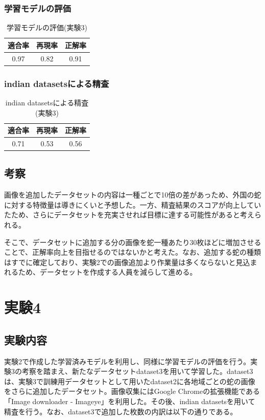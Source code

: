 \documentclass[a4paper, 11pt, titlepage]{jsarticle}
\begin{document}
\subsubsection{学習モデルの評価}
\begin{table}[htb]
\centering
  \caption{学習モデルの評価(実験3)}
  \begin{tabular}{|c|c|c|}  \hline
    適合率 & 再現率 & 正解率 \\ \hline
    0.97 & 0.82 & 0.91 \\ \hline
  \end{tabular}
\end{table}

\subsubsection{indian datasetsによる精査}
\begin{table}[htb]
\centering
  \caption{indian datasetsによる精査(実験3)}
  \begin{tabular}{|c|c|c|}  \hline
    適合率 & 再現率 & 正解率 \\ \hline
    0.71 & 0.53 & 0.56 \\ \hline
  \end{tabular}
\end{table}

\subsection{考察}
画像を追加したデータセットの内容は一種ごとで10倍の差があっため、外国の蛇に対する特徴量は導きにくいと予想した。一方、精査結果のスコアが向上していたため、さらにデータセットを充実させれば目標に達する可能性があると考えられる。\par
そこで、データセットに追加する分の画像を蛇一種あたり30枚ほどに増加させることで、正解率向上を目指せるのではないかと考えた。なお、追加する蛇の種類はすでに確定しており、実験2での画像追加より作業量は多くならないと見込まれるため、データセットを作成する人員を減らして進める。\par

\section{実験4}
\subsection{実験内容}
実験2で作成した学習済みモデルを利用し、同様に学習モデルの評価を行う。実験3の考察を踏まえ、新たなデータセットdataset3を用いて学習した。dataset3は、実験3で訓練用データセットとして用いたdataset2に各地域ごとの蛇の画像をさらに追加したデータセット。画像収集にはGoogle Chromeの拡張機能である「Image downloader - Imageye」を利用した。その後、indian datasetsを用いて精査を行う。なお、dataset3で追加した枚数の内訳は以下の通りである。\par
\end{document}
